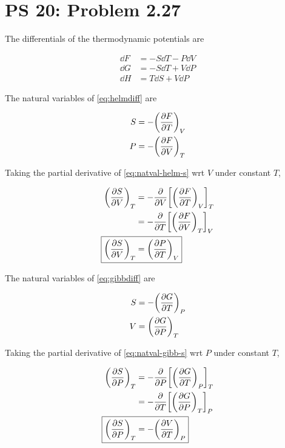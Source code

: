 \documentclass[12pt,a4paper,twocolumn]{article}
\begin{document}
\setcounter{page}{1}

\section*{PS 20: Problem 2.27}
\bigskip

The differentials of the thermodynamic potentials are

\begin{align}
	\dd{F} &= -S\dd{T} - P\dd{V} \label{eq:helmdiff} \\
	\dd{G} &= -S\dd{T} + V\dd{P} \label{eq:gibbdiff} \\
	\dd{H} &= T\dd{S} + V\dd{P} \label{eq:enthalpydiff}
\end{align}

The natural variables of \eqref{eq:helmdiff} are

\begin{align}
	S &= -\qty(\pdv{F}{T})_V \label{eq:natval-helm-s} \\
	P &= -\qty(\pdv{F}{V})_T \label{eq:natval-helm-p}
\end{align}

Taking the partial derivative of \eqref{eq:natval-helm-s} wrt $V$ under constant $T$,

\begin{align}
	\qty(\pdv{S}{V})_T &= -\pdv{V}\qty[\qty(\pdv{F}{T})_V]_T \nonumber \\
	&= -\pdv{T} \qty[\qty(\pdv{F}{V})_T]_V \nonumber \\
	\Aboxed{
		\qty(\pdv{S}{V})_T &= \qty(\pdv{P}{T})_V
	} \label{eq:proof-svt}
\end{align}

The natural variables of \eqref{eq:gibbdiff} are

\begin{align}
	S &= -\qty(\pdv{G}{T})_P \label{eq:natval-gibb-s} \\
	V &= \qty(\pdv{G}{P})_T \label{eq:natval-gibb-v}
\end{align}

Taking the partial derivative of \eqref{eq:natval-gibb-s} wrt $P$ under constant $T$,

\begin{align}
	\qty(\pdv{S}{P})_T &= -\pdv{P}\qty[\qty(\pdv{G}{T})_P]_T \nonumber \\
	&= -\pdv{T} \qty[\qty(\pdv{G}{P})_T]_P \nonumber \\
	\Aboxed{
		\qty(\pdv{S}{P})_T &= -\qty(\pdv{V}{T})_P
	} \label{eq:proof-spt}
\end{align}
\end{document}
